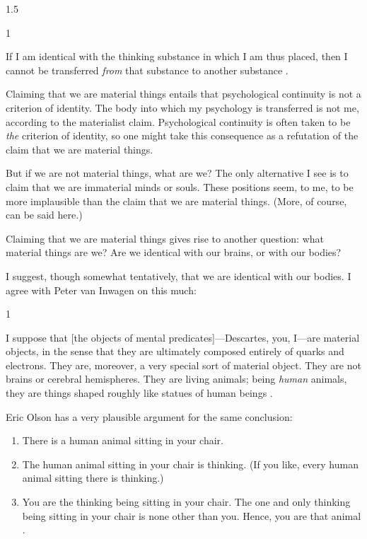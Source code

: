 \documentclass[11pt]{article}
\newenvironment{squote}{%
\begin{spacing}{1}
\begin{list}{}{%
\setlength{\labelwidth}{0pt}%
\rightmargin\leftmargin%
}
\item\relax
}{%
\end{list}%
\end{spacing}
}
\begin{document}
\begin{spacing}{1.5}
\begin{squote}
 If I am identical with the thinking substance in which I am thus
 placed, then I cannot be transferred {\em from} that substance to
 another substance \citep[107]{chisholm1979}.
\end{squote}

Claiming that we are material things entails that psychological
continuity is not a criterion of identity.  The body into which my
psychology is transferred is not me, according to the materialist
claim.  Psychological continuity is often taken to be {\em the}
criterion of identity, so one might take this consequence as a
refutation of the claim that we are material things.

But if we are not material things, what are we?  The only alternative
I see is to claim that we are immaterial minds or souls.  These
positions seem, to me, to be more implausible than the claim that we
are material things.  (More, of course, can be said here.)

Claiming that we are material things gives rise to another question:
what material things are we?  Are we identical with our brains, or
with our bodies?

I suggest, though somewhat tentatively, that we are identical with our
bodies.  I agree with Peter van Inwagen on this much:

\begin{squote}
I suppose that [the objects of mental predicates]---Descartes, you,
I---are material objects, in the sense that they are ultimately
composed entirely of quarks and electrons.  They are, moreover, a very
special sort of material object.  They are not brains or cerebral
hemispheres.  They are living animals; being {\em human} animals, they
are things shaped roughly like statues of human beings
\citeyearpar[6]{inwagen1995}.
\end{squote}

Eric Olson has a very plausible argument for the same conclusion:

\begin{enumerate}
  \item There is a human animal sitting in your chair.
  \item The human animal sitting in your chair is thinking. (If you
    like, every human animal sitting there is thinking.)
  \item You are the thinking being sitting in your chair. The one and
    only thinking being sitting in your chair is none other than
    you. Hence, you are that animal \citeyearpar[``8'']{olson2003a}.
\end{enumerate}


\end{spacing}
\end{document}
